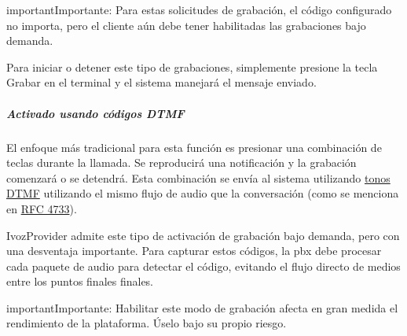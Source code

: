 \documentclass[letterpaper,10pt,spanish]{sphinxmanual}
\begin{document}
\begin{notice}{important}{Importante:}
Para estas solicitudes de grabación, el código configurado no importa, pero el cliente aún debe tener habilitadas las grabaciones bajo demanda.
\end{notice}

Para iniciar o detener este tipo de grabaciones, simplemente presione la tecla Grabar en el terminal y el sistema manejará el mensaje enviado.


\subparagraph{Activado usando códigos \emph{DTMF}}
\label{administration_portal/client/residential/calls/call_recordings:activated-using-dtmf-codes}
El enfoque más tradicional para esta función es presionar una combinación de teclas durante la llamada. Se reproducirá una notificación y la grabación comenzará o se detendrá. Esta combinación se envía al sistema utilizando \href{https://es.wikipedia.org/wiki/Marcaci\%C3\%B3n\_por\_tonos}{tonos DTMF} utilizando el mismo flujo de audio que la conversación (como se menciona en \href{https://tools.ietf.org/html/rfc4733}{RFC 4733}).

IvozProvider admite este tipo de activación de grabación bajo demanda, pero con una desventaja importante. Para capturar estos códigos, la pbx debe procesar cada paquete de audio para detectar el código, evitando el flujo directo de medios entre los puntos finales finales.

\begin{notice}{important}{Importante:}
Habilitar este modo de grabación afecta en gran medida el rendimiento de la plataforma. Úselo bajo su propio riesgo.
\end{notice}
\end{document}
